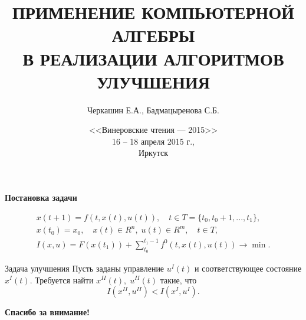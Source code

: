 \documentclass[10pt]{beamer}
\begin{document}
\title{ПРИМЕНЕНИЕ КОМПЬЮТЕРНОЙ АЛГЕБРЫ\\
В РЕАЛИЗАЦИИ АЛГОРИТМОВ УЛУЧШЕНИЯ}
\author{Черкашин Е.А., Бадмацыренова С.Б.}
\date[2015]{<<Винеровские чтения --- 2015>>
\\[0.3cm]
16 -- 18 апреля 2015 г.,\\
Иркутск
}
\maketitle

\begin{frame}{\textbf{Постановка задачи} }
\begin{block}{}
  \begin{gather}
x(t+1)=f(t,x(t),u(t)),\quad t \in T=\{t_0,t_0+1,...,t_1\},
	\label{eq100} \\
x(t_0)=x_0,\quad x(t)\in R^n,\; u(t) \in R^m,\quad t\in T,\label{eq100a} \\
I(x,u)=F(x(t_1))+ \sum_{t_0}^{t_1-1}f^0(t,x(t),u(t)) \to \min.
  \label{eq103}
  \end{gather}
\end{block}
\begin{block}{Задача улучшения}
  Пусть заданы управление $u^I(t)$ и соответствующее состояние $x^I(t)$. Требуется найти $x^{I\!I}(t),\; u^{I\!I}(t)$ такие, что
\[
I(x^{I\!I},u^{I\!I}) < I(x^I,u^I).
\]
 \end{block}
\end{frame}
\begin{frame}{}
\begin{center}
\Huge\textbf{Спасибо за внимание!}
\end{center}

\end{frame}
\end{document}
